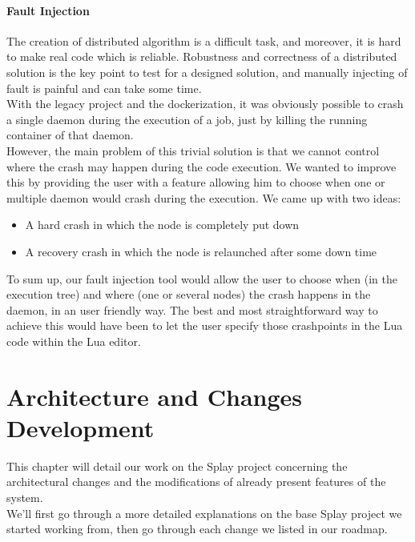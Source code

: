 \documentclass{eplmastersthesis}
\begin{document}
        \subsubsection{Fault Injection}

          The creation of distributed algorithm is a difficult task, and
          moreover, it is hard to make real code which is reliable. Robustness
          and correctness of a distributed solution is the key point to test
          for a designed solution, and manually injecting of fault is painful
          and can take some time. \\

          With the legacy project and the dockerization, it was obviously
          possible to crash a single daemon during the execution of a job, just
          by killing the running container of that daemon.\\
          However, the main problem of this trivial solution is that we cannot
          control where the crash may happen during the code execution.
          We wanted to improve this by providing the user with a feature
          allowing him to choose when one or multiple daemon would crash during
          the execution. We came up with two ideas:

          \begin{itemize}
            \item A hard crash in which the node is completely put down
            \item A recovery crash in which the node is relaunched after some
            down time
          \end{itemize}

          To sum up, our fault injection tool would allow the user to choose
          when (in the execution tree) and where (one or several nodes) the
          crash happens in the daemon, in an user friendly way. The best and
          most straightforward way to achieve this would have been to let
          the user specify those crashpoints in the Lua code within the Lua
          editor.

  \chapter{Architecture and Changes Development}

    This chapter will detail our work on the Splay project concerning the
    architectural changes and the modifications of already present features
    of the system.\\
    We'll first go through a more detailed explanations on the base Splay
    project we started working from, then go through each change we listed
    in our roadmap.
\end{document}
